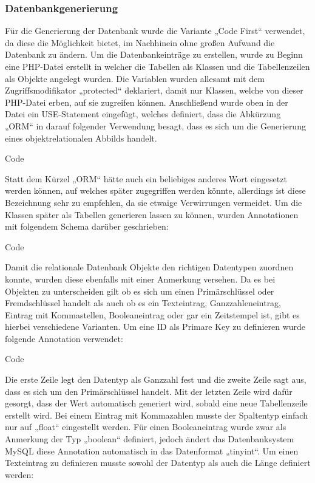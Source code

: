     \subsubsection{Datenbankgenerierung}

	Für die Generierung der Datenbank wurde die Variante „Code First“ verwendet, da diese die Möglichkeit bietet, im Nachhinein ohne großen Aufwand die Datenbank zu ändern.
	Um die Datenbankeinträge zu erstellen, wurde zu Beginn eine PHP-Datei erstellt in welcher die Tabellen als Klassen und die Tabellenzeilen als Objekte angelegt wurden. Die Variablen wurden allesamt mit dem Zugriffsmodifikator „protected“ deklariert, damit nur Klassen, welche von dieser PHP-Datei erben, auf sie zugreifen können. Anschließend wurde oben in der Datei ein USE-Statement eingefügt, welches definiert, dass die Abkürzung „ORM“ in darauf folgender Verwendung besagt, dass es sich um die Generierung eines objektrelationalen Abbilds handelt.
	
	Code
	
	Statt dem Kürzel „ORM“ hätte auch ein beliebiges anderes Wort eingesetzt werden können, auf welches später zugegriffen werden könnte, allerdings ist diese Bezeichnung sehr zu empfehlen, da sie etwaige Verwirrungen vermeidet.
	Um die Klassen später als Tabellen generieren lassen zu können, wurden Annotationen mit folgendem Schema darüber geschrieben:
	
	Code
	
	Damit die relationale Datenbank Objekte den richtigen Datentypen zuordnen konnte, wurden diese ebenfalls mit einer Anmerkung versehen. Da es bei Objekten zu unterscheiden gilt ob es sich um einen Primärschlüssel oder Fremdschlüssel handelt als auch ob es ein Texteintrag, Ganzzahleneintrag, Eintrag mit Kommastellen, Booleaneintrag oder gar ein Zeitstempel ist, gibt es hierbei verschiedene Varianten.
	Um eine ID als Primare Key zu definieren wurde folgende Annotation verwendet:
	
	Code
	
	Die erste Zeile legt den Datentyp als Ganzzahl fest und die zweite Zeile sagt aus, dass es sich um den Primärschlüssel handelt. Mit der letzten Zeile wird dafür gesorgt, dass der Wert automatisch generiert wird, sobald eine neue Tabellenzeile erstellt wird.
	Bei einem Eintrag mit Kommazahlen musste der Spaltentyp einfach nur auf „float“ eingestellt werden. Für einen Booleaneintrag wurde zwar als Anmerkung der Typ „boolean“ definiert, jedoch ändert das Datenbanksystem MySQL diese Annotation automatisch in das Datenformat „tinyint“.
	Um einen Texteintrag zu definieren musste sowohl der Datentyp als auch die Länge definiert werden:
	

